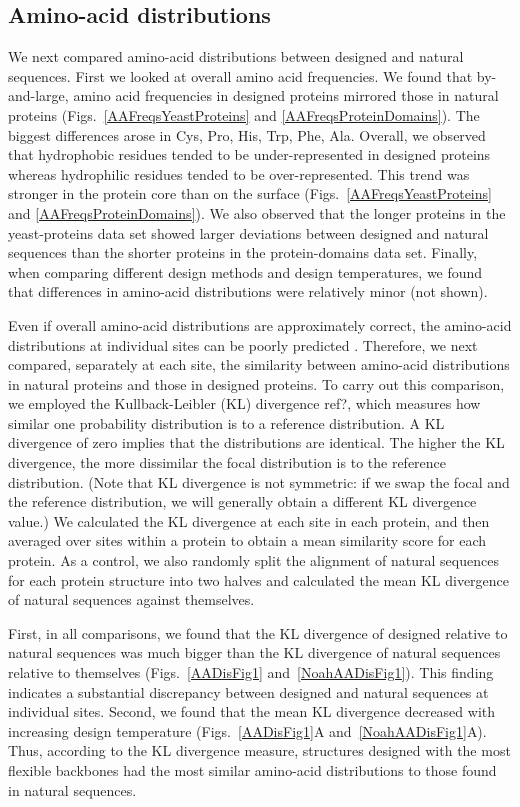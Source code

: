 \documentclass[12pt]{article}
\begin{document}
\subsection{Amino-acid distributions}
\label{AminoAcidDistributions}

We next compared amino-acid distributions between designed and natural sequences. First we looked at overall amino acid frequencies. We found that by-and-large, amino acid frequencies in designed proteins mirrored those in natural proteins (Figs.~\ref{AAFreqsYeastProteins} and \ref{AAFreqsProteinDomains}). The biggest differences arose in Cys, Pro, His, Trp, Phe, Ala. Overall, we observed that hydrophobic residues tended to be under-represented in designed proteins whereas hydrophilic residues tended to be over-represented. This trend was stronger in the protein core than on the surface (Figs.~\ref{AAFreqsYeastProteins} and \ref{AAFreqsProteinDomains}). We also observed that the longer proteins in the yeast-proteins data set showed larger deviations between designed and natural sequences than the shorter proteins in the protein-domains data set. Finally, when comparing different design methods and design temperatures, we found that differences in amino-acid distributions were relatively minor (not shown).

Even if overall amino-acid distributions are approximately correct, the amino-acid distributions at individual sites can be poorly predicted \cite{Ramsey2011}. Therefore, we next compared, separately at each site, the similarity between amino-acid distributions in natural proteins and those in designed proteins. To carry out this comparison, we employed the Kullback-Leibler (KL) divergence {\color{red}ref?}, which measures how similar one probability distribution is to a reference distribution. A KL divergence of zero implies that the distributions are identical. The higher the KL divergence, the more dissimilar the focal distribution is to the reference distribution. (Note that KL divergence is not symmetric: if we swap the focal and the reference distribution, we will generally obtain a different KL divergence value.) We calculated the KL divergence at each site in each protein, and then averaged over sites within a protein to obtain a mean similarity score for each protein. As a control, we also randomly split the alignment of natural sequences for each protein structure into two halves and calculated the mean KL divergence of natural sequences against themselves.

First, in all comparisons, we found that the KL divergence of designed relative to natural sequences was much bigger than the KL divergence of natural sequences relative to themselves (Figs.~\ref{AADisFig1} and~\ref{NoahAADisFig1}). This finding indicates a substantial discrepancy between designed and natural sequences at individual sites. Second, we found that the mean KL divergence decreased with increasing design temperature (Figs.~\ref{AADisFig1}A and~\ref{NoahAADisFig1}A). Thus, according to the KL divergence measure, structures designed with the most flexible backbones had the most similar amino-acid distributions to those found in natural sequences.
\end{document}
